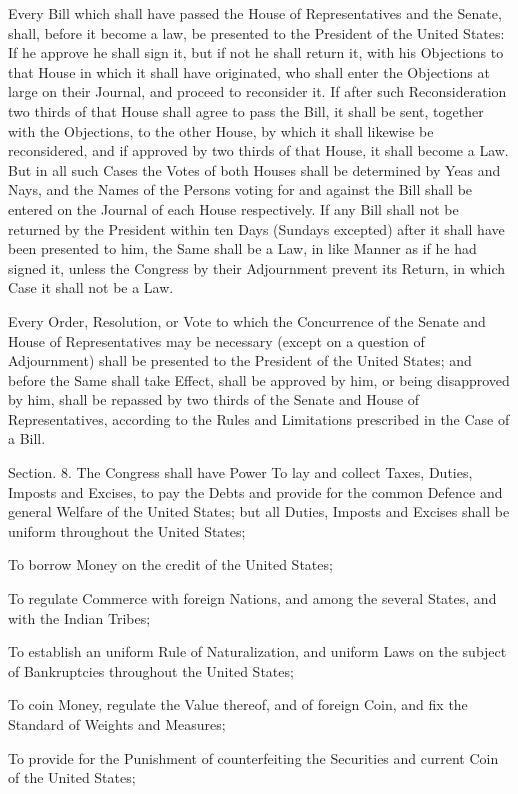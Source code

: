 \documentclass{article}
\begin{document}
Every Bill which shall have passed the House of Representatives and the
Senate, shall, before it become a law, be presented to the President of
the United States: If he approve he shall sign it, but if not he shall
return it, with his Objections to that House in which it shall have
originated, who shall enter the Objections at large on their Journal,
and proceed to reconsider it. If after such Reconsideration two thirds
of that House shall agree to pass the Bill, it shall be sent, together
with the Objections, to the other House, by which it shall likewise be
reconsidered, and if approved by two thirds of that House, it shall
become a Law. But in all such Cases the Votes of both Houses shall be
determined by Yeas and Nays, and the Names of the Persons voting for and
against the Bill shall be entered on the Journal of each House
respectively. If any Bill shall not be returned by the President within
ten Days (Sundays excepted) after it shall have been presented to him,
the Same shall be a Law, in like Manner as if he had signed it, unless
the Congress by their Adjournment prevent its Return, in which Case it
shall not be a Law.

Every Order, Resolution, or Vote to which the Concurrence of the Senate
and House of Representatives may be necessary (except on a question of
Adjournment) shall be presented to the President of the United States;
and before the Same shall take Effect, shall be approved by him, or
being disapproved by him, shall be repassed by two thirds of the Senate
and House of Representatives, according to the Rules and Limitations
prescribed in the Case of a Bill.

Section. 8.  The Congress shall have Power To lay and collect Taxes,
Duties, Imposts and Excises, to pay the Debts and provide for the common
Defence and general Welfare of the United States; but all Duties,
Imposts and Excises shall be uniform throughout the United States;

To borrow Money on the credit of the United States;

To regulate Commerce with foreign Nations, and among the several States,
and with the Indian Tribes;

To establish an uniform Rule of Naturalization, and uniform Laws on the
subject of Bankruptcies throughout the United States;

To coin Money, regulate the Value thereof, and of foreign Coin, and fix
the Standard of Weights and Measures;

To provide for the Punishment of counterfeiting the Securities and
current Coin of the United States;
\end{document}

